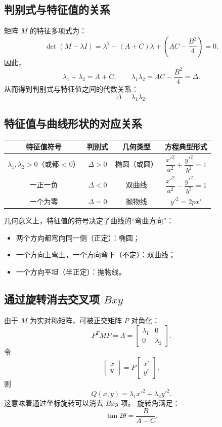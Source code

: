 \documentclass{ctexart}
\begin{document}
\subsection{判别式与特征值的关系}

矩阵 \(M\) 的特征多项式为：
\[
\det(M - \lambda I)
= \lambda^2 - (A + C)\lambda + \left(AC - \frac{B^2}{4}\right) = 0.
\]
因此，
\[
\lambda_1 + \lambda_2 = A + C, \qquad
\lambda_1 \lambda_2 = AC - \frac{B^2}{4} = \Delta.
\]
从而得到判别式与特征值之间的代数关系：
\[
\boxed{\Delta = \lambda_1 \lambda_2.}
\]



\subsection{特征值与曲线形状的对应关系}

\begin{table}[ht]
	\centering
	\begin{tabular}{|c|c|c|c|}
		\hline
		特征值符号 & 判别式 & 几何类型 & 方程典型形式 \\
		\hline
		\(\lambda_1, \lambda_2 > 0\)（或都 < 0） & \(\Delta > 0\) & 椭圆（或圆） & \(\dfrac{x'^2}{a^2} + \dfrac{y'^2}{b^2} = 1\) \\
		\hline
		一正一负 & \(\Delta < 0\) & 双曲线 & \(\dfrac{x'^2}{a^2} - \dfrac{y'^2}{b^2} = 1\) \\
		\hline
		一个为零 & \(\Delta = 0\) & 抛物线 & \(y'^2 = 2p x'\) \\
		\hline
	\end{tabular}
\end{table}

几何意义上，特征值的符号决定了曲线的“弯曲方向”：
\begin{itemize}
	\item 两个方向都弯向同一侧（正定）：椭圆；
	\item 一个方向上弯上，一个方向弯下（不定）：双曲线；
	\item 一个方向平坦（半正定）：抛物线。
\end{itemize}


\subsection{通过旋转消去交叉项 \texorpdfstring{\(Bxy\)}{Bxy}}

由于 \(M\) 为实对称矩阵，可被正交矩阵 \(P\) 对角化：
\[
P^T M P = \Lambda =
\begin{bmatrix}
	\lambda_1 & 0 \\ 0 & \lambda_2
\end{bmatrix}.
\]
令
\[
\begin{bmatrix}
	x \\ y
\end{bmatrix}
=
P
\begin{bmatrix}
	x' \\ y'
\end{bmatrix},
\]
则
\[
Q(x, y) = \lambda_1 x'^2 + \lambda_2 y'^2.
\]
这意味着通过坐标旋转可以消去 \(Bxy\) 项。  
旋转角满足：
\[
\tan 2\theta = \frac{B}{A - C}.
\]
\end{document}
